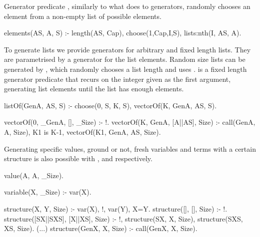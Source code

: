 


Generator predicate , similarly to what
 does to generators, randomly chooses an element%
from a non-empty list of possible elements.
%
\begin{yapcode}
 elements(AS, A, S) :-
   length(AS, Cap), choose(1,Cap,I,S), lists:nth(I, AS, A).
\end{yapcode}



To generate lists we provide generators for arbitrary and
fixed length lists.
%
They are %
parametrised by a generator for the list elements.
%
Random size lists can be generated by , which randomly
chooses a list length and uses . 
%
 is a fixed length generator predicate that recurs on
the integer given as the first argument, generating
list elements until the list has enough elements.
\begin{yapcode}
 listOf(GenA, AS, S) :- choose(0, S, K, S), vectorOf(K, GenA, AS, S).

 vectorOf(0, _GenA, [], _Size) :- !.
 vectorOf(K, GenA, [A||AS], Size) :-
   call(GenA, A, Size), K1 is K-1, vectorOf(K1, GenA, AS, Size).
\end{yapcode}


Generating specific values, ground or not, fresh variables and terms
with a certain structure is also possible with ,
 and  respectively.
%
\begin{yapcode}
 value(A, A, _Size).

 variable(X, _Size) :- var(X).

 structure(X, Y, Size) :- var(X), !, var(Y), X=Y.
 structure([], [], Size) :- !.
 structure([SX||SXS], [X||XS], Size) :-
   !, structure(SX, X, Size), structure(SXS, XS, Size).
 (...)
 structure(GenX, X, Size) :- call(GenX, X, Size).
\end{yapcode}



